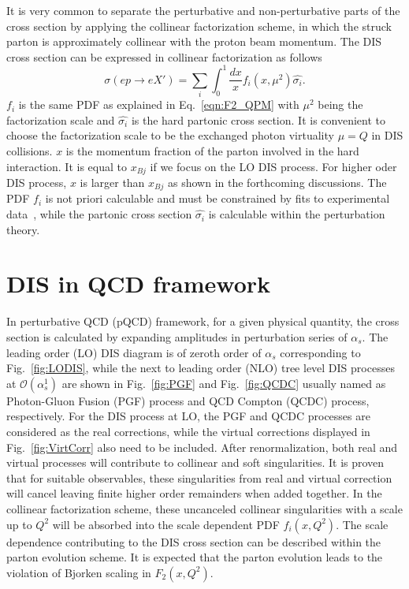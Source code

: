 It is very common to separate the perturbative and non-perturbative parts of the
cross section by applying the collinear factorization scheme, in which the
struck parton is approximately collinear with the proton beam momentum. The DIS
cross section can be expressed in collinear factorization as follows
\begin{equation}
\sigma(ep\rightarrow eX')=\sum_{i} \int^{1}_{0}\frac{dx}{x}f_{i}(x,\mu^{2})\hat{\sigma_{i}}.
\label{eqn:coll_factor}
\end{equation}
$f_{i}$ is the same PDF as explained in Eq.~\ref{eqn:F2_QPM} with $\mu^{2}$
being the factorization scale and $\hat{\sigma_{i}}$ is the hard partonic cross
section. It is convenient to choose the factorization scale to be the exchanged
photon virtuality $\mu=Q$ in DIS collisions. $x$ is the momentum fraction of the
parton involved in the hard interaction. It is equal to $x_{Bj}$ if we focus on
the LO DIS process. For higher oder DIS process, $x$ is larger than $x_{Bj}$ as
shown in the forthcoming discussions. The PDF $f_{i}$ is not priori calculable
and must be constrained by fits to experimental data~\cite{Aaron:2009aa}, while
the partonic cross section $\hat{\sigma_{i}}$ is calculable within the
perturbation theory.


\section{DIS in QCD framework}\label{sec:DISinQCD}
In perturbative QCD (pQCD) framework, for a given physical quantity, the cross
section is calculated by expanding amplitudes in perturbation series of
$\alpha_{s}$. The leading order (LO) DIS diagram is of zeroth order of
$\alpha_{s}$ corresponding to Fig.~\ref{fig:LODIS}, while the next to leading
order (NLO) tree level DIS processes at $\mathcal{O}(\alpha_{s}^{1})$ are shown
in Fig.~\ref{fig:PGF} and Fig.~\ref{fig:QCDC} usually named as Photon-Gluon
Fusion (PGF) process and QCD Compton (QCDC) process, respectively. For the DIS process at LO,
the PGF and QCDC processes are considered as the real corrections, while the
virtual corrections displayed in Fig.~\ref{fig:VirtCorr} also need to be
included. After renormalization, both real and virtual processes will contribute to collinear and soft singularities. It is proven~\cite{Kinoshita:1962ur,Lee:1964is} that for suitable observables, these singularities from real and virtual correction will cancel leaving finite higher order remainders when added together. In the
collinear factorization scheme, these uncanceled collinear singularities with a
scale up to $Q^{2}$ will be absorbed into the scale dependent PDF $f_{i}(x,Q^{2})$. The
scale dependence contributing to the DIS cross section
can be described within the parton evolution scheme. It is expected that the
parton evolution leads to the violation of Bjorken scaling in $F_{2}(x,Q^{2})$.

